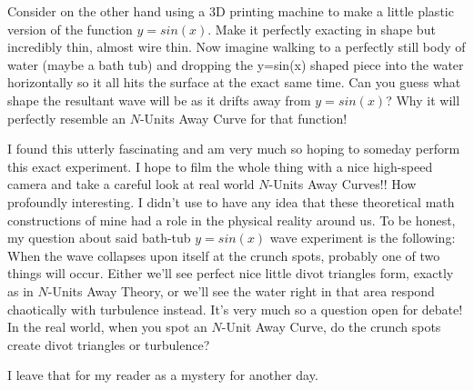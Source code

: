 Consider on the other hand using a 3D printing machine to make a little plastic version of the function $y = sin(x)$. Make it perfectly exacting in shape but incredibly thin, almost wire thin. Now imagine walking to a perfectly still body of water (maybe a bath tub) and dropping the y=sin(x) shaped piece into the water horizontally so it all hits the surface at the exact same time. Can you guess what shape the resultant wave will be as it drifts away from $y = sin(x)$? Why it will perfectly resemble an $N$-Units Away Curve for that function!

I found this utterly fascinating and am very much so hoping to someday perform this exact experiment. I hope to film the whole thing with a nice high-speed camera and take a careful look at real world $N$-Units Away Curves!! How profoundly interesting. I didn't use to have any idea that these theoretical math constructions of mine had a role in the physical reality around us. To be honest, my question about said bath-tub $y = sin(x)$ wave experiment is the following: When the wave collapses upon itself at the crunch spots, probably one of two things will occur. Either we’ll see perfect nice little divot triangles form, exactly as in $N$-Units Away Theory, or we’ll see the water right in that area respond chaotically with turbulence instead. It’s very much so a question open for debate! In the real world, when you spot an $N$-Unit Away Curve, do the crunch spots create divot triangles or turbulence?

I leave that for my reader as a mystery for another day.
